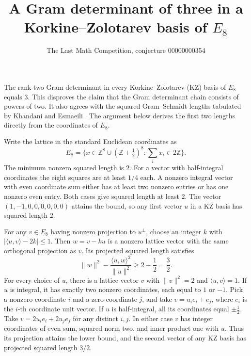 \documentclass[11pt]{article}
\title{A Gram determinant of three in a Korkine--Zolotarev basis of \(E_8\)}
\author{The Last Math Competition, conjecture 00000000354}
\date{}
\begin{document}
\maketitle

The rank-two Gram determinant in every Korkine--Zolotarev (KZ) basis of
\(E_8\) equals \(3\). This disproves the claim that the Gram determinant
chain consists of powers of two.
It also agrees with the squared Gram--Schmidt lengths tabulated by
Khandani and Esmaeili \cite[p.~154]{ke}. The argument below derives the
first two lengths directly from the coordinates of \(E_8\).

Write the lattice in the standard Euclidean coordinates as
\[
 E_8=\bigl\{x\in \mathbb Z^8\cup(\mathbb Z+\tfrac12)^8:
                         \textstyle\sum_i x_i\in 2\mathbb Z\bigr\}.
\]
The minimum nonzero squared length is \(2\). For a vector with half-integral
coordinates the eight squares are at least \(1/4\) each. A nonzero integral
vector with even coordinate sum either has at least two nonzero entries or
has one nonzero even entry. Both cases give squared length at least \(2\).
The vector \((1,-1,0,0,0,0,0,0)\) attains the bound, so any first vector
\(u\) in a KZ basis has squared length \(2\).

For any \(v\in E_8\) having nonzero projection to \(u^\perp\), choose an integer
\(k\) with \(\lvert\langle u,v\rangle-2k\rvert\le 1\). Then \(w=v-ku\) is
a nonzero lattice vector with the same orthogonal projection as \(v\). Its
projected squared length satisfies
\[
 \|w\|^2-\frac{\langle u,w\rangle^2}{\|u\|^2}
        \ge 2-\frac12=\frac32.
\]
For every choice of \(u\), there is a lattice vector \(v\) with
\(\|v\|^2=2\) and \(\langle u,v\rangle=1\). If \(u\) is integral, it has
exactly two nonzero coordinates, each equal to \(1\) or \(-1\). Pick a nonzero
coordinate \(i\) and a zero coordinate \(j\), and take \(v=u_i e_i+e_j\),
where \(e_i\) is the \(i\)-th coordinate unit vector. If \(u\) is
half-integral, all its coordinates equal \(\pm\tfrac12\). Take
\(v=2u_i e_i+2u_j e_j\) for any distinct \(i,j\). In either case \(v\) has
integer coordinates of even sum, squared norm two, and inner product one
with \(u\). Thus its projection attains the lower bound, and the second
vector of any KZ basis has projected squared length \(3/2\).
\end{document}
